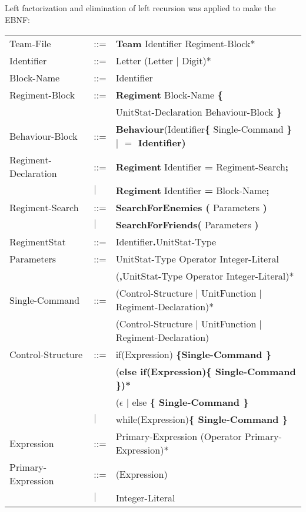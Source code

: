 	Left factorization and elimination of left recursion was applied to make the EBNF: \\
	\begin{center}
		\begin{longtable}{ l l l }
			\endfirsthead
			\endhead
	Team-File					&	::=	&{\bf Team} Identifier Regiment-Block*\\
	Identifier					&	::=	&Letter (Letter $\mid$ Digit)*\\
	Block-Name					&	::=	&Identifier\\
	Regiment-Block				&	::=	&{\bf Regiment} Block-Name {\bf \{ } \\
								&		&UnitStat-Declaration Behaviour-Block \bf{\} }\\
	Behaviour-Block				&	::=	&{\bf Behaviour}(Identifier{\bf \{ }Single-Command \bf{\} } $\mid$ {\bf $=$} Identifier)\\
	Regiment-Declaration		&	::=	&{\bf Regiment} Identifier {\bf =} Regiment-Search{\bf ;}\\
								&$\mid$	&{\bf Regiment} Identifier {\bf =} Block-Name{\bf ;}\\
	Regiment-Search				&	::=	&{\bf SearchForEnemies (} Parameters {\bf )}\\
								&$\mid$	&{\bf SearchForFriends(} Parameters {\bf )}\\
	RegimentStat				&	::=	&Identifier{\bf.}UnitStat-Type \\
	Parameters					&	::=	&UnitStat-Type Operator Integer-Literal\\
								&		&({\bf ,}UnitStat-Type Operator Integer-Literal)*\\
	Single-Command				&	::=	&(Control-Structure $\mid$ UnitFunction $\mid$ Regiment-Declaration)*\\
								&		&(Control-Structure $\mid$ UnitFunction $\mid$ Regiment-Declaration)\\		
	Control-Structure			&	::=	&if(Expression) \bf{\{}Single-Command \bf{\}}\\
								&		&(\bf{else if(}Expression\bf{)\{ }Single-Command\bf{ \}})* \\
								&		&($\epsilon$ $\mid$ else \bf{\{ }Single-Command \bf{\} }\\					   
								&$\mid$	&while(Expression)\bf{\{ } Single-Command \bf{\}}\\
	Expression					&	::=	&Primary-Expression (Operator Primary-Expression)*\\
	Primary-Expression			&	::=	&(Expression)\\
								&$\mid$	&Integer-Literal \\

\end{longtable}
\end{center}
